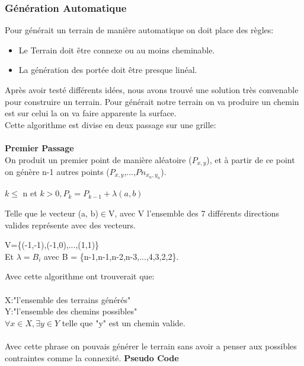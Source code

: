 \documentclass{article}
\begin{document}
\subsubsection{Génération Automatique}
Pour générait un terrain de manière automatique on doit place des règles:
\begin{itemize}
\item Le Terrain doit être connexe ou au moins cheminable.
\item La génération des portée doit être presque linéal.

\end{itemize}
Après avoir testé différents idées, nous avons trouvé une solution très convenable pour construire un terrain. Pour générait notre terrain on va produire un chemin est sur celui la on va faire apparente la surface.\\
Cette algorithme est divise en deux passage sur une grille:\\~\\
\textbf{\Large{Premier Passage}}\\
On produit un premier point de manière aléatoire ($P_{x,y}$), et à partir de ce point on génère n-1 autres points ($P_{x,y}$,...,$Pn_{x_n,y_n}$).
\begin{center}
	$k\leq$ n et $k>0, P_{k} = P_{k-1} + \lambda(a, b)$
\end{center}
Telle que le vecteur (a, b)$\in$V, avec V l'ensemble des 7 différents directions valides représente avec des vecteurs.
\begin{center}
	V=\{(-1,-1),(-1,0),...,(1,1)\}\\
	Et $\lambda = B_i$ avec B = \{n-1,n-1,n-2,n-3,...,4,3,2,2\}.
\end{center}
Avec cette algorithme ont trouverait que:\\~\\
X:"l'ensemble des terrains générés" \\
Y:"l'ensemble des chemins possibles"\\
\(\forall x \in X, \exists y \in Y\) telle que "y" est un chemin valide.\\~\\
Avec cette phrase on pouvais générer le terrain sans avoir a penser aux possibles contraintes comme la connexité.
\newpage
\textbf{\Large{Pseudo Code}}\\~\\
\end{document}
